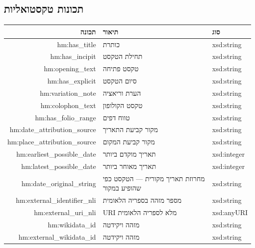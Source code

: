 \documentclass[12pt,a4paper]{article}
\newcommand{\new}[1]{\textcolor{newaddition}{#1}}
\begin{document}
\subsection{תכונות טקסטואליות}

\begin{longtable}{|r|p{5cm}|p{3cm}|}
\hline
\textbf{תכונה} & \textbf{תיאור} & \textbf{סוג} \\
\hline
\endhead

hm:has\_title & כותרת & xsd:string\\
\hline
hm:has\_incipit & תחילת הטקסט & xsd:string\\
\hline
hm:opening\_text & טקסט פתיחה & xsd:string\\
\hline
hm:has\_explicit & סיום הטקסט & xsd:string\\
\hline
hm:variation\_note & הערת וריאציה & xsd:string\\
\hline
hm:colophon\_text & טקסט הקולופון & xsd:string\\
\hline
hm:has\_folio\_range & טווח דפים & xsd:string\\
\hline

hm:date\_attribution\_source & מקור קביעת התאריך & xsd:string\\
\hline
hm:place\_attribution\_source & מקור קביעת המקום & xsd:string\\
\hline

hm:earliest\_possible\_date & תאריך מוקדם ביותר & xsd:integer\\
\hline

hm:latest\_possible\_date & תאריך מאוחר ביותר & xsd:integer\\
\hline

\new{hm:date\_original\_string} & \new{מחרוזת תאריך מקורית — הטקסט כפי שהופיע במקור} & xsd:string\\
\hline

hm:external\_identifier\_nli & מספר מזהה בספריה הלאומית & xsd:string\\
\hline

hm:external\_uri\_nli & URI מלא לספריה הלאומית & xsd:anyURI\\
\hline

hm:wikidata\_id & מזהה ויקידטה & xsd:string\\
\hline

hm:external\_wikidata\_id & מזהה ויקידטה & xsd:string\\
\hline


\end{longtable}
\end{document}
